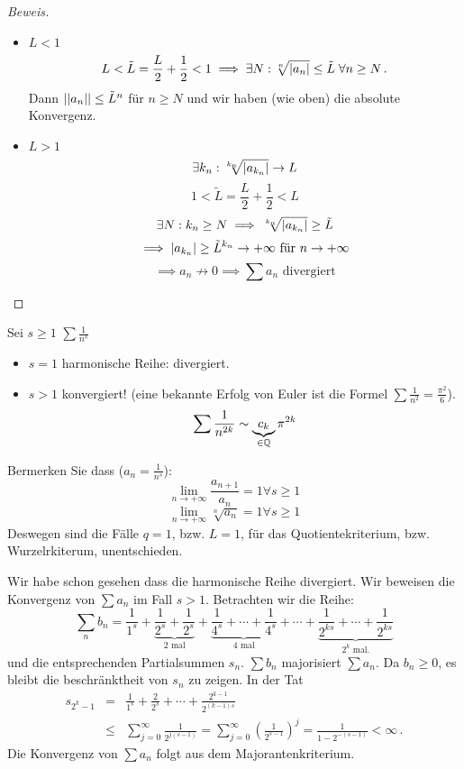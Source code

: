 \begin{proof}[Beweis]
  \begin{itemize}
    \item $L<1$ 
      \[L<\tilde L=\frac{L}{2}+\frac{1}{2}<1 \implies \exists N: 
\sqrt[n]{\mathopen| a_n \mathclose|}\leq\tilde L\; \forall n\geq N\, . \]
Dann $|\mathopen| a_n \mathclose||\leq\tilde{L}^n$ für $n\geq N$ und wir haben
(wie oben) die absolute Konvergenz.
    \item $L>1$
      \[\exists k_n: \sqrt[k_n]{\mathopen| a_{k_n} \mathclose|}\to L\]
      \[1<\tilde{L}=\frac{L}{2}+\frac{1}{2}<L\]
      \[\exists N: k_n\geq N \implies \sqrt[k_n]{\mathopen| a_{k_n} \mathclose|}\geq \tilde L\]
      \[\implies \mathopen| a_{k_n} \mathclose|\geq \tilde{L}^{k_n}\to+\infty\text{ für } n\to+\infty\]
      \[\implies a_n\not\to 0\implies \sum a_n\text{ divergiert}\]
  \end{itemize}
\end{proof}
\begin{Bsp}
  Sei $s\geq 1$ $\sum\frac{1}{n^s}$
  \begin{itemize}
    \item $s=1$ harmonische Reihe: divergiert.
    \item $s>1$ konvergiert! (eine bekannte Erfolg von Euler
ist die Formel $\sum\frac{1}{n^2} =\frac{\pi^2}{6}$).
      \[\sum\frac{1}{n^{2k}}\sim \underbrace{c_k}_{\in\mathbb{Q}}\pi^{2k}\]
\end{itemize} 
Bermerken Sie dass ($a_n=\frac{1}{n^s}$):
\[\lim_{n\to+\infty}\frac{a_{n+1}}{a_n}=1\forall s\geq 1\]
\[\lim_{n\to+\infty}\sqrt[n]{a_n}=1\forall s\geq 1\]
Deswegen sind die F\"alle $q=1$, bzw. $L=1$, f\"ur das
Quotientekriterium, bzw. Wurzelrkiterum, unentschieden.

Wir habe schon gesehen dass die harmonische Reihe divergiert.
Wir beweisen die Konvergenz von $\sum a_n$ im Fall $s>1$.
Betrachten wir die Reihe:
\[\sum_n b_n = \frac{1}{1^s}+\underbrace{\frac{1}{2^s}+\frac{1}{2^s}}_
{\mbox{$2$ mal}}+ \underbrace{\frac{1}{4^s}+\cdots+
\frac{1}{4^s}}_{\mbox{$4$ mal}}+\cdots + \underbrace{\frac{1}{2^{ks}}+\cdots
+ \frac{1}{2^{ks}}}_{\mbox{$2^k$ mal.}}
\]
und die entsprechenden Partialsummen $s_n$. $\sum b_n$ majorisiert $\sum a_n$.
Da $b_n\geq 0$, es bleibt die beschr\"anktheit von $s_n$ zu zeigen.
In der Tat
\begin{eqnarray*}
s_{2^k-1}&=&\frac{1}{1^s}+\frac{2}{2^s}+\cdots+\frac{2^{k-1}}{2^{(k-1)s}}\\
&\leq& \sum_{j=0}^\infty \frac{1}{2^{j(s-1)}} = \sum_{j=0}^\infty
\left(\frac{1}{2^{s-1}}\right)^j = \frac{1}{1-2^{-(s-1)}} <\infty\, .
\end{eqnarray*}
Die Konvergenz von $\sum a_n$ folgt aus dem Majorantenkriterium.
\end{Bsp}

